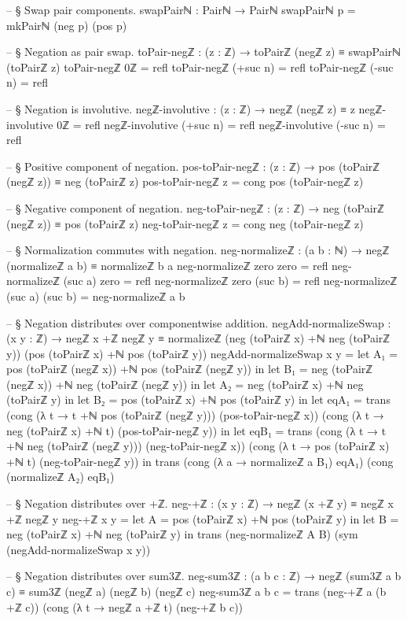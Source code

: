\documentclass[11pt,a4paper]{book}
\begin{document}
\begin{code}
-- § Swap pair components.
swapPairℕ : Pairℕ → Pairℕ
swapPairℕ p = mkPairℕ (neg p) (pos p)

-- § Negation as pair swap.
toPair-negℤ : (z : ℤ) → toPairℤ (negℤ z) ≡ swapPairℕ (toPairℤ z)
toPair-negℤ 0ℤ = refl
toPair-negℤ (+suc n) = refl
toPair-negℤ (-suc n) = refl

-- § Negation is involutive.
negℤ-involutive : (z : ℤ) → negℤ (negℤ z) ≡ z
negℤ-involutive 0ℤ = refl
negℤ-involutive (+suc n) = refl
negℤ-involutive (-suc n) = refl

-- § Positive component of negation.
pos-toPair-negℤ : (z : ℤ) → pos (toPairℤ (negℤ z)) ≡ neg (toPairℤ z)
pos-toPair-negℤ z = cong pos (toPair-negℤ z)

-- § Negative component of negation.
neg-toPair-negℤ : (z : ℤ) → neg (toPairℤ (negℤ z)) ≡ pos (toPairℤ z)
neg-toPair-negℤ z = cong neg (toPair-negℤ z)

-- § Normalization commutes with negation.
neg-normalizeℤ : (a b : ℕ) → negℤ (normalizeℤ a b) ≡ normalizeℤ b a
neg-normalizeℤ zero zero = refl
neg-normalizeℤ (suc a) zero = refl
neg-normalizeℤ zero (suc b) = refl
neg-normalizeℤ (suc a) (suc b) = neg-normalizeℤ a b

-- § Negation distributes over componentwise addition.
negAdd-normalizeSwap : (x y : ℤ) →
  negℤ x +ℤ negℤ y ≡
  normalizeℤ (neg (toPairℤ x) +ℕ neg (toPairℤ y)) (pos (toPairℤ x) +ℕ pos (toPairℤ y))
negAdd-normalizeSwap x y =
  let A₁ = pos (toPairℤ (negℤ x)) +ℕ pos (toPairℤ (negℤ y)) in
  let B₁ = neg (toPairℤ (negℤ x)) +ℕ neg (toPairℤ (negℤ y)) in
  let A₂ = neg (toPairℤ x) +ℕ neg (toPairℤ y) in
  let B₂ = pos (toPairℤ x) +ℕ pos (toPairℤ y) in
  let eqA₁ =
        trans
          (cong (λ t → t +ℕ pos (toPairℤ (negℤ y))) (pos-toPair-negℤ x))
          (cong (λ t → neg (toPairℤ x) +ℕ t) (pos-toPair-negℤ y))
      in
  let eqB₁ =
        trans
          (cong (λ t → t +ℕ neg (toPairℤ (negℤ y))) (neg-toPair-negℤ x))
          (cong (λ t → pos (toPairℤ x) +ℕ t) (neg-toPair-negℤ y))
      in
  trans (cong (λ a → normalizeℤ a B₁) eqA₁)
        (cong (normalizeℤ A₂) eqB₁)

-- § Negation distributes over +ℤ.
neg-+ℤ : (x y : ℤ) → negℤ (x +ℤ y) ≡ negℤ x +ℤ negℤ y
neg-+ℤ x y =
  let A = pos (toPairℤ x) +ℕ pos (toPairℤ y) in
  let B = neg (toPairℤ x) +ℕ neg (toPairℤ y) in
  trans (neg-normalizeℤ A B) (sym (negAdd-normalizeSwap x y))

-- § Negation distributes over sum3ℤ.
neg-sum3ℤ : (a b c : ℤ) → negℤ (sum3ℤ a b c) ≡ sum3ℤ (negℤ a) (negℤ b) (negℤ c)
neg-sum3ℤ a b c =
  trans (neg-+ℤ a (b +ℤ c))
        (cong (λ t → negℤ a +ℤ t) (neg-+ℤ b c))


\end{code}
\end{document}
